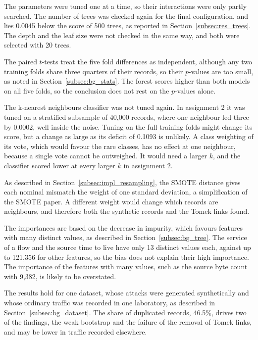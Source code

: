 \documentclass[conference,10pt]{IEEEtran}
\begin{document}
The parameters were tuned one at a time, so their interactions were only
partly searched. The number of trees was checked again for the final
configuration, and lies 0.0045 below the score of 500 trees, as reported in Section~\ref{subsec:res_trees}. The depth and the leaf size were not
checked in the same way, and both were selected with 20 trees.

The paired $t$-tests treat the five fold differences as independent,
although any two training folds share three quarters of their records, so
their $p$-values are too small, as noted in Section~\ref{subsec:bg_stats}. The forest scores higher than both models on all five folds, so the conclusion does not rest on the
$p$-values alone.

The k-nearest neighbours classifier was not tuned again. In assignment 2 it
was tuned on a stratified subsample of 40,000 records, where one neighbour
led three by 0.0002, well inside the noise. Tuning on the full training folds might change its score, but a change as
large as its deficit of 0.1093 is unlikely. A class weighting of its vote,
which would favour the rare classes, has no effect at one neighbour, because
a single vote cannot be outweighed. It would need a larger $k$, and the
classifier scored lower at every larger $k$ in assignment 2.

As described in Section~\ref{subsec:impl_resampling}, the SMOTE distance gives each nominal mismatch the weight of one standard deviation, a simplification of the SMOTE paper. A different weight would
change which records are neighbours, and therefore both the synthetic
records and the Tomek links found.

The importances are based on the decrease in impurity, which favours
features with many distinct values, as described in Section~\ref{subsec:bg_tree}. The
service of a flow and the source time to live have only 13 distinct values
each, against up to 121,356 for other features, so the bias does not
explain their high importance. The importance of the features with many values, such
as the source byte count with 9,382, is likely to be overstated.

The results hold for one dataset, whose attacks were generated
synthetically and whose ordinary traffic was recorded in one laboratory, as described in Section~\ref{subsec:bg_dataset}. The share of duplicated records, 46.5\%,
drives two of the findings, the weak bootstrap and the failure of the
removal of Tomek links, and may be lower in traffic recorded elsewhere.
\end{document}
